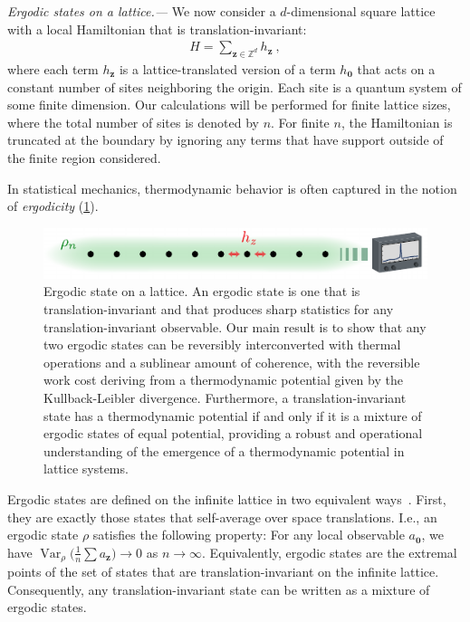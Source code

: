 \documentclass[prl,reprint,longbibliography,superscriptaddress]{revtex4-1}
\DeclareMathOperator{\Var}{Var}
\renewcommand\paragraph[1]{%
  \par\emph{#1.---}\kern2pt\relax\ignorespaces}
\begin{document}
\paragraph{Ergodic states on a lattice}%
We now consider a $d$-dimensional square lattice with a local Hamiltonian that
is translation-invariant:
\begin{align}
  H = \sum_{\boldsymbol{z}\in\mathbb{Z}^d} h_{\boldsymbol{z}}\ ,
\end{align}
where each term $h_{\boldsymbol{z}}$ is a lattice-translated version of a term
$h_{\boldsymbol{0}}$ that acts on a constant number of sites neighboring the
origin.  Each site is a quantum system of some finite dimension.  
Our calculations will be performed for finite lattice sizes, where the total
number of sites is denoted by $n$.  For finite $n$, the Hamiltonian is truncated
at the boundary by ignoring any terms that have support outside of the finite
region considered.

In statistical mechanics, thermodynamic behavior is often captured in the notion
of \emph{ergodicity} (\cref{fig:LatticeErgodicState}).
\begin{figure}
  \centering
  \includegraphics{fig/LatticeErgodicState}
  \caption{Ergodic state on a lattice.  An ergodic state is one that is
    translation-invariant and that produces sharp statistics for any
    translation-invariant observable.  Our main result is to show that any two
    ergodic states can be reversibly interconverted with thermal operations and
    a sublinear amount of coherence, with the reversible work cost deriving from
    a thermodynamic potential given by the Kullback-Leibler divergence.
    Furthermore, a translation-invariant state has a thermodynamic potential if
    and only if it is a mixture of ergodic states of equal potential, providing
    a robust and operational understanding of the emergence of a thermodynamic
    potential in lattice systems.}
  \label{fig:LatticeErgodicState}
\end{figure}
Ergodic states are defined on the infinite lattice in two equivalent
ways~\cite{BookRuelle_StatMechRigorous,%
  BookBratteliRobinson_OpAlgQStatMech1,%
  BookBratteliRobinson_OpAlgQStatMech2,%
  Bjelakovic2004CMP_ergodic,Bjelakovic2004IM_lattice}.  First, they are exactly
those states that self-average over space translations. 
I.e., an ergodic state $\rho$ satisfies the following property: For any local
observable $a_{\boldsymbol{0}}$,
we have $\Var_\rho\bigl(\frac1n\sum a_{\boldsymbol{z}}\bigr) \to 0$ as
$n\to\infty$.
%
Equivalently, ergodic states are the extremal points of the set of states that
are translation-invariant on the infinite lattice.  Consequently, any
translation-invariant state can be written as a mixture of ergodic states.
\end{document}
